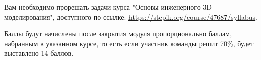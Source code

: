 
Вам необходимо прорешать задачи курса "Основы инженерного 3D-моделирования"{}, доступного по ссылке: \url{https://stepik.org/course/47687/syllabus}.

\markSection

Баллы будут начислены после закрытия модуля пропорционально баллам, набранным в указанном курсе, то есть если участник команды решит 70\%, будет выставлено 14 баллов. 

